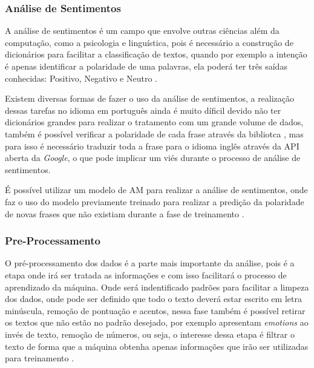           \subsubsection{Análise de Sentimentos}

          A análise de sentimentos é um campo que envolve outras ciências além da computação, como a psicologia e linguística, pois é necessário 
          a construção de dicionários para facilitar a classificação de textos, quando por exemplo a intenção é apenas identificar a polaridade
          de uma palavras, ela poderá ter três saídas conhecidas: Positivo, Negativo e Neutro \cite{wegrzyn2012tweets}. 
          
          Existem diversas formas de fazer o uso da análise de sentimentos, a realização dessas tarefas no idioma em português ainda é muito díficil devido 
          não ter dicionários grandes para realizar o tratamento com um grande volume de dados, também é possível verificar a polaridade de cada frase através
          da bibliotca \cite{textblob}, mas para isso é necessário traduzir toda a frase para o idioma inglês através da \acrshort{API} aberta da \textit{Google},
          o que pode implicar um viés durante o processo de análise de sentimentos.
          
          É possível utilizar um modelo de \acrshort{AM} para realizar a análise de sentimentos, onde faz o uso do modelo previamente treinado para realizar a predição
          da polaridade de novas frases que não existiam durante a fase de treinamento \cite{golbeck2010twitter}.
          
          
        \subsubsection{Pre-Processamento}

            O pré-processamento dos dados é a parte mais importante da análise, pois é a etapa onde irá ser tratada as informações e com isso 
          facilitará o processo de aprendizado da máquina. Onde será indentificado padrões para facilitar a limpeza dos dados, onde pode ser definido
          que todo o texto deverá estar escrito em letra minúscula, remoção de pontuação e acentos, nessa fase também é possível retirar os textos que não 
          estão no padrão desejado, por exemplo apresentam \textit{emotions} ao invés de texto, remoção de números, ou seja, o interesse dessa etapa é 
          filtrar o texto de forma que a máquina obtenha apenas informações que irão ser utilizadas para treinamento \cite{ferreirametodo}.

